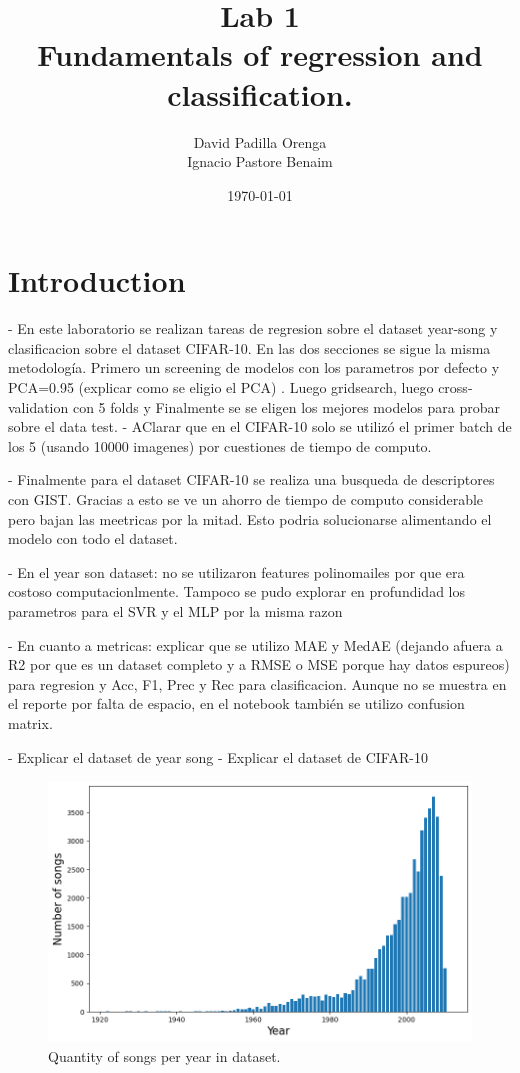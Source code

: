 \documentclass[twocolumn]{article}
\title{Lab 1 \\ \small Fundamentals of regression and classiﬁcation.}
\author{David Padilla Orenga\\ Ignacio Pastore Benaim}
\date{\today}   %
\begin{document}
\maketitle




\section{Introduction}

- En este laboratorio se realizan tareas de regresion sobre el dataset year-song y clasificacion sobre el dataset CIFAR-10. 
En las dos secciones se sigue la misma metodología. Primero un screening de modelos con los parametros por defecto y PCA=0.95 (explicar como se eligio el PCA)
. Luego gridsearch, luego cross-validation con 5 folds y Finalmente se se eligen los mejores modelos para probar sobre el data test.
- AClarar que en el CIFAR-10 solo se utilizó el primer batch de los 5 (usando 10000 imagenes) por cuestiones de tiempo de computo.

- Finalmente para el dataset CIFAR-10 se realiza una busqueda de descriptores con GIST. Gracias a esto se ve un ahorro de tiempo de computo considerable
pero bajan las meetricas por la mitad. Esto podria solucionarse alimentando el modelo con todo el dataset. 

- En el year son dataset: no se utilizaron features polinomailes por que era costoso computacionlmente. Tampoco se pudo explorar en profundidad 
los parametros para el SVR y el MLP por la misma razon

- En cuanto a metricas: explicar que se utilizo MAE y MedAE (dejando afuera a R2 por que es un dataset completo y a RMSE o MSE porque hay datos espureos) 
para regresion y Acc, F1, Prec y Rec para clasificacion. Aunque no se muestra en el reporte por falta de espacio, en el notebook también se utilizo confusion matrix.

- Explicar el dataset de year song
- Explicar el dataset de CIFAR-10





\begin{figure}[!htb]
    \centering
    \includegraphics[width=0.95\columnwidth]{images/songs/year_songs.png}
    \caption{Quantity of songs per year in dataset.}
    \label{fig:year_songs}
\end{figure}
\end{document}

